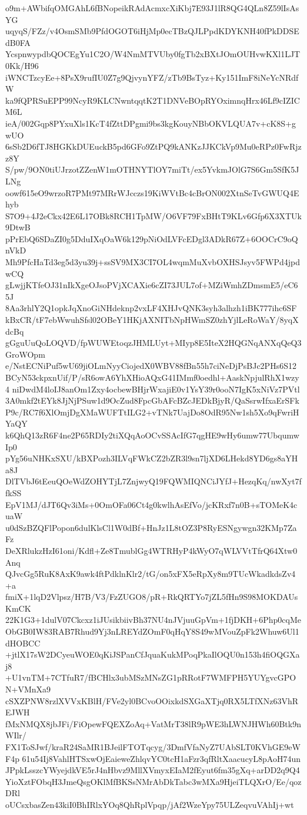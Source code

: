 o9m+AWbifqOMGAhL6fBNopeikRAdAcmxcXiKbj7E93J1lR8QG4QLn8Z59lIsAsYG
uqyqS/FZz/v4OsmSMb9PfdOGOT6iHjMp0ecTBzQJLPpdKDYKNH40fPkDDSEdB0FA
YcspnwypdbQOCEgYu1C2O/W4NmMTVUby0fgTb2xBXtJOmOUHvwKXl1LJT0Kk/H96
iWNCTzcyEe+8PsX9rufIU0Z7g9QjvynYFZ/zTb9BsTyz+Ky151ImF8iNeYcNRdfW
ka9fQPRSuEPP99NcyR9KLCNwntqqtK2T1DNVeBOpRYOximnqHrx46Lf9cIZICM6L
ieA/002Gqp8PYxuXls1KcT4fZttDPgmi9bs3kgKouyNBbOKVLQUA7v+cK8S+gwUO
6sSb2D6fTJ8HGKkDUEuckB5pd6GFo9ZtPQ9kANKzJJKCkVp9Mu0eRPz0FwRjzz8Y
S/pw/9ON0tiUJrzotZZenW1mOTHNYTlOY7miTt/ex5YvkmJOlG7S6Gm5SfK5JLNg
oowf615eO9wrzoR7PMt97MRrWJcczs19KiWVtBc4cBrON002XtnSeTvGWUQ4Ehyb
S7O9+4J2eCkx42E6L17OBk8RCH1TpMW/O6VF79FxBHtT9KLv6Gfp6X3XTUk9DtwB
pPrEbQ6SDaZI0g5DduIXqOaW6k129pNiOdLVFcEDgl3ADkR67Z+6OOCrC9oQnVkD
Mh9PfcHaTd3eg5d3yu39j+ssSV9MX3CI7OL4wqmMuXvbOXHSJsyv5FWPd4jpdwCQ
gLwjjKTfeOJ31nIkXgeOJsoPVjXCAXie6cZI73JUL7of+MZiWmhZDmsmE5/eC65J
8Aa3rhlY2Q1opkJqXnoGiNHdeknp2vxLF4XHJvQNK3syh3alhzh1iBK777ihc6SF
kBxCR/tF7ebWwuhSfsl02OBeY1HKjAXNITbNpHWmSZ0zhYjlLeRoWaY/8yqXdcBq
gGguUuQoLOQVD/fpWUWEtoqzJHMLUyt+MIyp8E5IteX2HQGNqANXqQeQ3GroWOpm
e/NstECNiPuf5wU69jiOLmNyyCiojedX0WBV88fBn55h7ciNeDjPsBJc2PHs6S12
BCyN53ckpxnUif/P/sR6owA6YhXHioAQxG41IMmf0oedhl+AaskNpjulRhX1wzy4
niDwdM4loIJ8anOm1Zxy4ocbewBHjrWxajiE0v1YsY39r0ooN7IgK5xNiVz7PVtl
3A0mkf2tEYk8JjNjPSuw1d9OcZud8FpcGbAFcBZcJEDkBjyR/QaSsrwIfxaErSFk
P9c/RC7f6XlOmjDgXMaWUFTtILG2+vTNk7UajDo8OdR95Nw1sh5Xo9qFwriHYaQY
k6QhQ13zR6F4ne2P65RDIy2tiXQqAoOCvSSAcIfG7qgHE9wHy6umw77UbqumwIp0
pYg56uNHKxSXU/kBXPozh3ILVqFWkCZ2bZR3l9sn7ljXD6LHekd8YD6gs8aYHa8J
DlTVbJ6tEeuQOeWdZOHYTjL7ZnjwyQ19FQWMIQNCiJYfJ+HezqKq/nwXyt7ffkSS
EpV1MJ/dJT6Qv3iMs+0OmOFa06Ct4g0kwlhAsEfVo/jcKRxf7n0B+sTOMeK4cuaW
u0dSzBZQFlPopon6dulKlsCl1W0dBf+HnJz1L8tOZ3P8RyESNgywgn32KMp7ZaFz
DeXRlukzHzI61oni/Kdfl+Ze8TmublGg4WTRHyP4kWyO7qWLVVtTfrQ64Xtw0Anq
QJvcGg5RuK8AxK9awk4ftPdklnKlr2/tG/on5xFX5eRpXy8m9TUcWkadkdsZv4+a
fmiX+1lqD2Vlpsz/H7B/V3/FzZUGO8/pR+RkQRTYo7jZL5fHn9S98MOKDAUsKmCK
22K1G3+1dulV07Ckcxz1iJUsikbiivBh37NU4nJVjuuGpVm+1fjDKH+6Php0cqMe
ObGB0IW83RAB7Rhud9Yj3nLREYdZOmF0qHqY8S49wMVouZpFk2Whuw6Ul1dHOBCC
+jtlX17sW2DCyeuWOE0qKiJSPanCfJquaKukMPoqPkaIlOQU0n153h4fiOQGXaj8
+U1vnTM+7CTfuR7/fBCHlx3ubMSzMNsZG1pRRotF7WMFPH5YUYgvcGPON+VMnXa9
cSXZPNW8rzlXVVxKBlH/FVe2yl0BCvoOOixkdSXGaXTjq0RX5LTfXNz63VhREJWH
fMxNMQX8jbJFi/FiOpewFQEXZoAq+VatMrT38lR9pWE3hLWNJHWh60Btk9nWIlr/
FX1ToSJwf/kraR24SaMR1BJeilFTOTqcyg/3DmfVfaNyZ7UAbSLT0KVhGE9eWF4p
61u54Ij8VahlHTSxwOjEaieweZhlqvYC0tcH1aFzr3qfRltXaacucyL8pAoH74un
JPpkLsszcYWyejdkVE5rJ4nHbvz9MllXVmyxEIaM2fEyut6fm35gXq+arDD2q9Q4
YioXztFObqH3JmeQsgOKlMfBKSsNMrAbDkTabc3wMXa9HjeiTLQXrO/Ee/qozDRl
oUCsxbasZen43kiI0BhIRlxYOq8QhRplVpqp/jAf2WzeYpy75ULZeqvuVAhIj+wt
